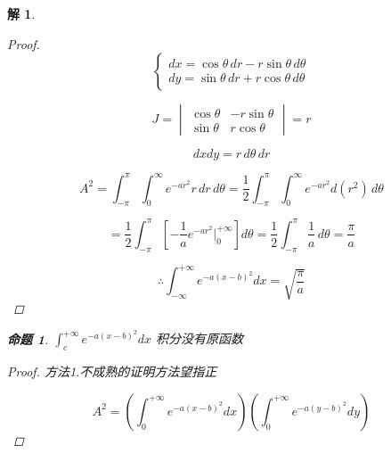 \documentclass[12pt,a4paper]{article}
\newtheorem*{solution}{解}
\newtheorem{example}{命题}
\begin{document}
\begin{solution}
\begin{proof}
	\begin{equation*}
		\begin{cases}
			dx = \cos\theta \, dr - r \sin\theta \, d\theta \\
			dy = \sin\theta \, dr + r \cos\theta \, d\theta
		\end{cases}
	\end{equation*}
	
	\begin{equation*}
		J = \begin{vmatrix}
			\cos\theta & -r \sin\theta \\
			\sin\theta & r \cos\theta
		\end{vmatrix} = r
	\end{equation*}
	
	\begin{equation*}
		dx dy = r \, d\theta \, dr
	\end{equation*}
	
	\begin{equation*}
		A^2 = \int_{-\pi}^{\pi} \int_{0}^{\infty} e^{-ar^2} r \, dr \, d\theta	= \frac{1}{2} \int_{-\pi}^{\pi} \int_{0}^{\infty} e^{-ar^2} d(r^2) \, d\theta
	\end{equation*}
	
	
	\begin{equation*}
		= \frac{1}{2} \int_{-\pi}^{\pi} \left[ -\frac{1}{a} e^{-ar^2} \Big|_{0}^{+\infty} \right] d\theta= \frac{1}{2} \int_{-\pi}^{\pi} \frac{1}{a} \, d\theta	= \frac{\pi}{a}
	\end{equation*}
	
	
	\begin{equation*}
	\therefore	\int_{-\infty}^{+\infty} e^{-a(x-b)^2} dx = \sqrt{\frac{\pi}{a}}
	\end{equation*}
	
	\end{proof}

	\begin{example}
		\label{ex:2}
			$	\int_{c}^{+\infty} e^{-a(x-b)^2} dx$
		积分没有原函数
	\end{example}
	
	\begin{proof}
		
		
		方法1.不成熟的证明方法望指正
		
		


	
	\begin{equation*}
		A^2 = \left( \int_{0}^{+\infty} e^{-a(x-b)^2} dx \right) \left( \int_{0}^{+\infty} e^{-a(y-b)^2} dy \right)
	\end{equation*}
	

\end{proof}
\end{solution}
\end{document}
